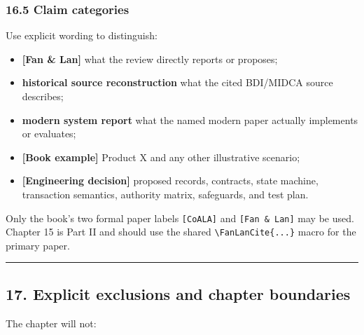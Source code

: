 \subsubsection{16.5 Claim categories}\label{claim-categories}

Use explicit wording to distinguish:

\begin{itemize}
\tightlist
\item
  \textbf{{[}Fan \& Lan{]}} what the review directly reports or proposes;
\item
  \textbf{historical source reconstruction} what the cited BDI/MIDCA source describes;
\item
  \textbf{modern system report} what the named modern paper actually implements or evaluates;
\item
  \textbf{{[}Book example{]}} Product X and any other illustrative scenario;
\item
  \textbf{{[}Engineering decision{]}} proposed records, contracts, state machine, transaction semantics, authority matrix, safeguards, and test plan.
\end{itemize}

Only the book's two formal paper labels \texttt{{[}CoALA{]}} and \texttt{{[}Fan\ \&\ Lan{]}} may be used. Chapter 15 is Part II and should use the shared \texttt{\textbackslash{}FanLanCite\{...\}} macro for the primary paper.

\begin{center}\rule{0.5\linewidth}{0.5pt}\end{center}

\subsection{17. Explicit exclusions and chapter boundaries}\label{explicit-exclusions-and-chapter-boundaries}

The chapter will not:

